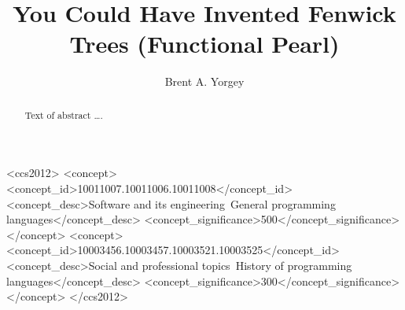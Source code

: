 \documentclass[acmsmall,review]{acmart}\settopmatter{printfolios=true,printccs=false,printacmref=false}
\begin{document}
\title{You Could Have Invented Fenwick Trees (Functional Pearl)}



\author{Brent A. Yorgey}


\begin{abstract}
Text of abstract \ldots.
\end{abstract}


\begin{CCSXML}
<ccs2012>
<concept>
<concept_id>10011007.10011006.10011008</concept_id>
<concept_desc>Software and its engineering~General programming languages</concept_desc>
<concept_significance>500</concept_significance>
</concept>
<concept>
<concept_id>10003456.10003457.10003521.10003525</concept_id>
<concept_desc>Social and professional topics~History of programming languages</concept_desc>
<concept_significance>300</concept_significance>
</concept>
</ccs2012>
\end{CCSXML}
\end{document}
